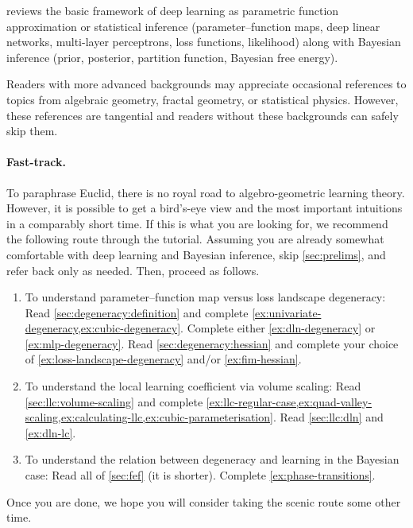 \documentclass[11pt]{article}
\begin{document}
 reviews the basic framework of deep learning as parametric
function approximation or statistical inference (parameter--function maps, deep
linear networks, multi-layer perceptrons, loss functions, likelihood) along
with Bayesian inference (prior, posterior, partition function, Bayesian free
energy).

Readers with more advanced backgrounds may appreciate occasional references to
topics from algebraic geometry, fractal geometry, or statistical physics.
However, these references are tangential and readers without these backgrounds
can safely skip them.

\paragraph{Fast-track.}

To paraphrase Euclid, there is no royal road to algebro-geometric learning
theory. However, it is possible to get a bird's-eye view and the most important
intuitions in a comparably short time. If this is what you are looking for, we
recommend the following route through the tutorial. Assuming you are already
somewhat comfortable with deep learning and Bayesian inference, skip
\cref{sec:prelims}, and refer back only as needed. Then, proceed as follows.
\begin{enumerate}
    \item
        To understand parameter--function map versus loss landscape degeneracy:
        Read \cref{sec:degeneracy:definition} and complete
        \cref{ex:univariate-degeneracy,ex:cubic-degeneracy}.
        Complete either \cref{ex:dln-degeneracy} or \ref{ex:mlp-degeneracy}.
        Read \cref{sec:degeneracy:hessian} and complete your choice of
            \cref{ex:loss-landscape-degeneracy} and/or \cref{ex:fim-hessian}.
    \item
        To understand the local learning coefficient via volume scaling:
        Read \cref{sec:llc:volume-scaling} and complete
        \cref{ex:llc-regular-case,ex:quad-valley-scaling,ex:calculating-llc,ex:cubic-parameterisation}.
        Read \cref{sec:llc:dln} and \cref{ex:dln-lc}.
    \item
        To understand the relation between degeneracy and learning in the
        Bayesian case:
        Read all of \cref{sec:fef} (it is shorter).
        Complete \cref{ex:phase-transitions}.
\end{enumerate}
Once you are done, we hope you will consider taking the scenic route some other
time.
\end{document}

